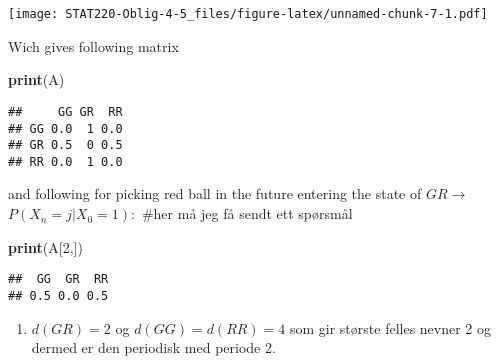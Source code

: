\documentclass[]{article}
\newenvironment{Shaded}{\begin{snugshade}}{\end{snugshade}}
\newcommand{\DataTypeTok}[1]{\textcolor[rgb]{0.13,0.29,0.53}{#1}}
\newcommand{\DecValTok}[1]{\textcolor[rgb]{0.00,0.00,0.81}{#1}}
\newcommand{\FloatTok}[1]{\textcolor[rgb]{0.00,0.00,0.81}{#1}}
\newcommand{\KeywordTok}[1]{\textcolor[rgb]{0.13,0.29,0.53}{\textbf{#1}}}
\newcommand{\NormalTok}[1]{#1}
\newcommand{\OperatorTok}[1]{\textcolor[rgb]{0.81,0.36,0.00}{\textbf{#1}}}
\newcommand{\OtherTok}[1]{\textcolor[rgb]{0.56,0.35,0.01}{#1}}
\newcommand{\StringTok}[1]{\textcolor[rgb]{0.31,0.60,0.02}{#1}}
\providecommand{\tightlist}{%
  \setlength{\itemsep}{0pt}\setlength{\parskip}{0pt}}
\begin{document}
\begin{Shaded}
\end{Shaded}

\texttt{[image: STAT220-Oblig-4-5\_files/figure-latex/unnamed-chunk-7-1.pdf]}

Wich gives following matrix

\begin{Shaded}
\begin{Highlighting}[]
\KeywordTok{print}\NormalTok{(A)}
\end{Highlighting}
\end{Shaded}

\begin{verbatim}
##     GG GR  RR
## GG 0.0  1 0.0
## GR 0.5  0 0.5
## RR 0.0  1 0.0
\end{verbatim}

and following for picking red ball in the future entering the state of
\(GR\rightarrow\) \(P(X_{n}=j|X_{0}=1):\) \#her må jeg få sendt ett
spørsmål

\begin{Shaded}
\begin{Highlighting}[]
\KeywordTok{print}\NormalTok{(A[}\DecValTok{2}\NormalTok{,])}
\end{Highlighting}
\end{Shaded}

\begin{verbatim}
##  GG  GR  RR 
## 0.5 0.0 0.5
\end{verbatim}

\begin{enumerate}
\def\labelenumi{\alph{enumi})}
\setcounter{enumi}{1}
\tightlist
\item
  \(d(GR)=2\) og \(d(GG)=d(RR)=4\) som gir største felles nevner 2 og
  dermed er den periodisk med periode 2.
\end{enumerate}
\end{document}
